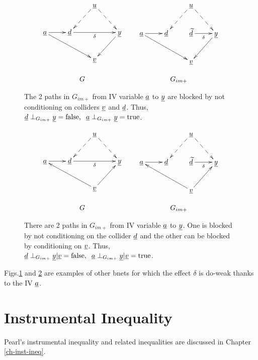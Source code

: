 \begin{figure}[h!]
$$
\begin{array}{ccc}
\xymatrix{
&&\rvu\ar@{-->}[dl]\ar@{-->}[dr]
\\
\rva\ar[r]\ar[drr]
&\rvd\ar[rr]_\delta
&&\rvy\ar[dl]
\\
&&\rvv
}
&&
\xymatrix{
&&\rvu\ar@{-->}[dl]\ar@{-->}[dr]
\\
\rva\ar[r]\ar[drr]
&\rvd&
\rvtd\ar[r]_\delta
&\rvy\ar[dl]
\\
&&\rvv
}
\\
\\
G&&G_{im+}
\end{array}
$$
\caption{The 2 paths in $G_{im+}$
from
IV variable $\rva$
to $\rvy$ are blocked by
not conditioning on colliders $\rvv$
and $\rvd$. Thus,
$
\rvd\perp_{G_{im+}} \rvy =\text{false}, 
\;\; \rva\perp_{G_{im+}} \rvy= \text{true}
$.
}
\label{fig-iv-G-im-blocked}
\end{figure}




\begin{figure}[h!]
$$
\begin{array}{ccc}
\xymatrix{
&&\rvu\ar@{-->}[dl]\ar@{-->}[dr]
\\
\rva\ar[r]
&\rvd\ar[rr]_\delta
&&\rvy
\\
&&\rvv\ar[ur]\ar[ull]
}
&&
\xymatrix{
&&\rvu\ar@{-->}[dl]\ar@{-->}[dr]
\\
\rva\ar[r]
&\rvd
&
\rvtd\ar[r]_\delta
&\rvy
\\
&&\rvv\ar[ur]\ar[ull]
}
\\
\\
G&&G_{im+}
\end{array}
$$
\caption{
There are 2 paths in $G_{im+}$
from
IV variable $\rva$
to $\rvy$. One is
blocked
by not conditioning on the collider $\rvd$
and the other
can be blocked by 
conditioning on $\rvv$. Thus,
$
\rvd\perp_{G_{im+}} \rvy|\rvv =\text{false}, 
\;\; \rva\perp_{G_{im+}} \rvy|\rvv= \text{true}
$.
}
\label{fig-iv-G-im-strata}
\end{figure}

Figs.\ref{fig-iv-G-im-blocked}
and \ref{fig-iv-G-im-strata}
are examples of 
other bnets 
for which the
effect $\delta$
is do-weak
thanks
to the
IV $\rva$.


\section{Instrumental Inequality}
Pearl's instrumental inequality
and related inequalities are discussed in
 Chapter
 \ref{ch-inst-ineq}.


